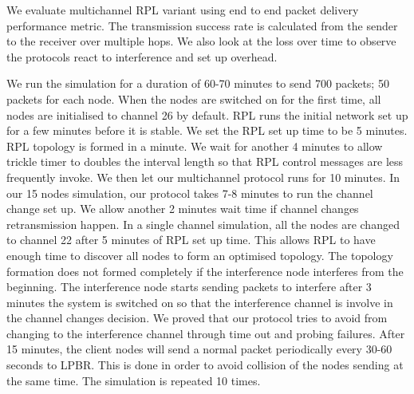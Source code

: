 

We evaluate multichannel RPL variant using end to end packet delivery performance metric. The transmission success rate is calculated from the sender to the receiver over multiple hops. We also look at the loss over time to observe the protocols react to interference and set up overhead.


We run the simulation for a duration of 60-70 minutes to send 700 packets; 50 packets for each node. When the nodes are switched on for the first time, all nodes are initialised to channel 26 by default. RPL runs the initial network set up for a few minutes before it is stable. We set the RPL set up time to be 5 minutes. RPL topology is formed in a minute. We wait for another 4 minutes to allow trickle timer to doubles the interval length so that RPL control messages are less frequently invoke. We then let our multichannel protocol runs for 10 minutes. In our 15 nodes simulation, our protocol takes 7-8 minutes to run the channel change set up. We allow another 2 minutes wait time if channel changes retransmission happen. In a single channel simulation, all the nodes are changed to channel 22 after 5 minutes of RPL set up time. This allows RPL to have enough time to discover all nodes to form an optimised topology. The topology formation does not formed completely if the interference node interferes from the beginning. The interference node starts sending packets to interfere after 3 minutes the system is switched on so that the interference channel is involve in the channel changes decision. We proved that our protocol tries to avoid from changing to the interference channel through time out and probing failures. After 15 minutes, the client nodes will send a normal packet periodically every 30-60 seconds to LPBR. This is done in order to avoid collision of the nodes sending at the same time. The simulation is repeated 10 times.



